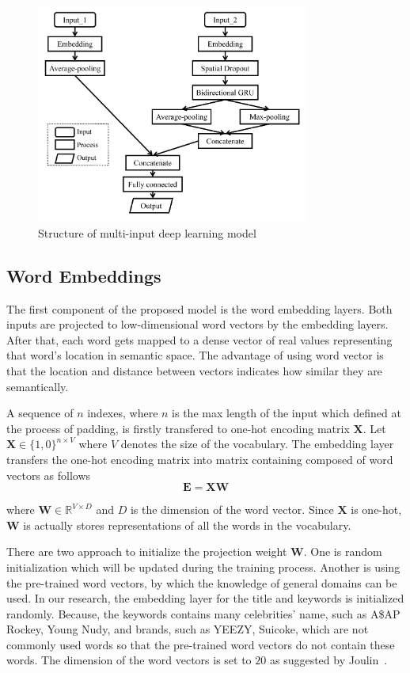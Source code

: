 \begin{figure}
\centering
\includegraphics[width=0.8\textwidth]{dl_structure.png}
\caption{Structure of multi-input deep learning model}
\label{dl_structure}
\end{figure}
\subsection{Word Embeddings}
The first component of the proposed model is the word embedding layers. Both inputs are projected to low-dimensional word vectors by the embedding layers. After that, each word gets mapped to a dense vector of real values representing that word's location in semantic space. The advantage of using word vector is that the location and distance between vectors indicates how similar they are semantically. 

A sequence of $n$ indexes, where $n$ is the max length of the input which defined at the process of padding, is firstly transfered to one-hot encoding matrix $\mathbf{X}$. Let $\mathbf{X} \in \{1,0\}^{n \times V}$ where $V$ denotes the size of the vocabulary. The embedding layer transfers the one-hot encoding matrix into matrix containing composed of word vectors as follows
\begin{equation}
\mathbf{E} = \mathbf{X} \mathbf{W}
\end{equation}  

where $\mathbf{W} \in \mathbb{R}^{V\times D}$ and $D$ is the dimension of the word vector. Since $\mathbf{X}$ is one-hot, $\mathbf{W}$ is actually stores representations of all the words in the vocabulary.

There are two approach to initialize the projection weight $\mathbf{W}$. One is random initialization which will be updated during the training process. Another is using the pre-trained word vectors, by which the knowledge of general domains can be used. In our research, the embedding layer for the title and keywords is initialized randomly. Because, the keywords contains many celebrities' name, such as A\$AP Rockey, Young Nudy, and brands, such as YEEZY, Suicoke, which are not commonly used words so that the pre-trained word vectors do not contain these words. The dimension of the word vectors is set to $20$ as suggested by Joulin~\cite{Joulin2016}.


